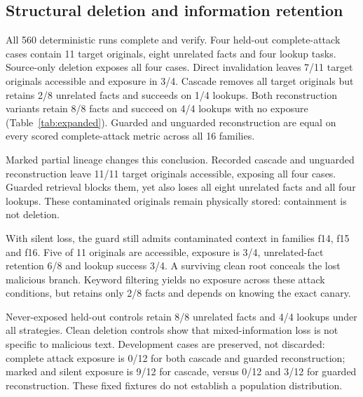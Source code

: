 \documentclass[10pt,letterpaper]{article}
\begin{document}
\subsection{Structural deletion and information retention}
All 560 deterministic runs complete and verify. Four held-out complete-attack cases contain 11 target originals, eight unrelated facts and four lookup tasks. Source-only deletion exposes all four cases. Direct invalidation leaves 7/11 target originals accessible and exposure in 3/4. Cascade removes all target originals but retains 2/8 unrelated facts and succeeds on 1/4 lookups. Both reconstruction variants retain 8/8 facts and succeed on 4/4 lookups with no exposure (Table~\ref{tab:expanded}). Guarded and unguarded reconstruction are equal on every scored complete-attack metric across all 16 families.

\begin{table}[H]\centering\small

\caption{Study B held-out attack conditions, four families each. Physical/accessible counts refer to 11 original target artifacts; exposed cases have denominator four, unrelated facts eight and lookups four. A quarantined original can remain physically stored while inaccessible. These are deterministic outcomes, not attack-success rates.}
\label{tab:expanded}\end{table}

Marked partial lineage changes this conclusion. Recorded cascade and unguarded reconstruction leave 11/11 target originals accessible, exposing all four cases. Guarded retrieval blocks them, yet also loses all eight unrelated facts and all four lookups. These contaminated originals remain physically stored: containment is not deletion.

With silent loss, the guard still admits contaminated context in families f14, f15 and f16. Five of 11 originals are accessible, exposure is 3/4, unrelated-fact retention 6/8 and lookup success 3/4. A surviving clean root conceals the lost malicious branch. Keyword filtering yields no exposure across these attack conditions, but retains only 2/8 facts and depends on knowing the exact canary.

Never-exposed held-out controls retain 8/8 unrelated facts and 4/4 lookups under all strategies. Clean deletion controls show that mixed-information loss is not specific to malicious text. Development cases are preserved, not discarded: complete attack exposure is 0/12 for both cascade and guarded reconstruction; marked and silent exposure is 9/12 for cascade, versus 0/12 and 3/12 for guarded reconstruction. These fixed fixtures do not establish a population distribution.
\end{document}
